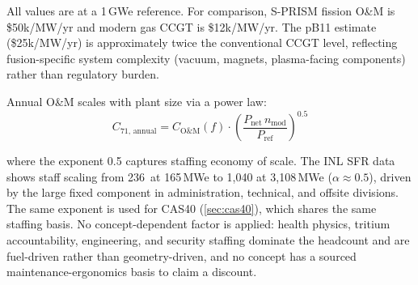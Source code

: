 \documentclass{article}
\begin{document}
\noindent All values are at a 1\,GWe reference. For
comparison, S-PRISM fission O\&M is \$50k/MW/yr and modern gas CCGT
is \$12k/MW/yr. The pB11 estimate (\$25k/MW/yr) is approximately
twice the conventional CCGT level, reflecting fusion-specific system
complexity (vacuum, magnets, plasma-facing components) rather than
regulatory burden.

Annual O\&M scales with plant size via a power law:
\begin{equation}
\label{eq:cas71}
C_{71,\,\text{annual}} = C_{\text{O\&M}}(f) \cdot
               \left(\frac{P_{\text{net}}\,n_{\text{mod}}}{P_{\text{ref}}}\right)^{0.5}
\end{equation}

\noindent where the exponent 0.5 captures staffing economy of scale.
The INL SFR data \citep{prosser2024} shows staff scaling from
236~at 165\,MWe to 1{,}040 at 3{,}108\,MWe ($\alpha \approx 0.5$),
driven by the large fixed component in administration, technical, and
offsite divisions. The same exponent is used for CAS40
(\cref{sec:cas40}), which shares the same staffing basis. No
concept-dependent factor is applied: health physics, tritium
accountability, engineering, and security staffing dominate the
headcount and are fuel-driven rather than geometry-driven, and no
concept has a sourced maintenance-ergonomics basis to claim a discount.
\end{document}
